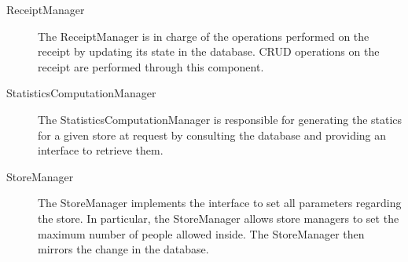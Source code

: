\documentclass[../../main.tex]{subfiles}
\begin{document}
\begin{description}
    \item[ReceiptManager] The ReceiptManager is in charge of the operations performed on the receipt by updating its 
    state in the database. CRUD operations on the receipt are performed through this component.
    
    \item[StatisticsComputationManager]  The StatisticsComputationManager is responsible for 
    generating the statics for a given store at request by consulting the database and providing an interface to retrieve them.	  
     
    \item[StoreManager] The StoreManager implements the interface to set all parameters regarding the store. 
    In particular, the StoreManager allows store managers to set the maximum number of people allowed inside. 
    The StoreManager then mirrors the change in the database.
\end{description}
\end{document}
